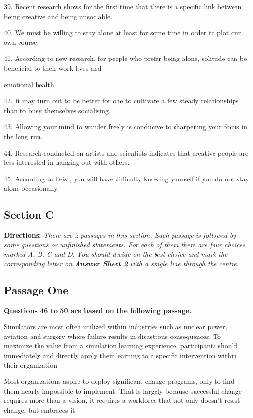 \documentclass[UTF8,11pt]{ctexart}
\begin{document}
39. Recent research shows for the first time that there is a specific link between being creative and being unsociable.


40. We must be willing to stay alone at least for some time in order to plot our own course.


41. According to new research, for people who prefer being alone, solitude can be beneficial to their work lives and


emotional health.


42. It may turn out to be better for one to cultivate a few steady relationships than to busy themselves socialising.


43. Allowing your mind to wander freely is conducive to sharpening your focus in the long run.


44. Research conducted on artists and scientists indicates that creative people are less interested in hanging out with others.


45. According to Feist, you will have difficulty knowing yourself if you do not stay alone occasionally.


\subsection*{\textbf{Section C}}


\textbf{Directions: }\textit{There are 2 passages in this section. Each passage is followed by some questions or unfinished} \textit{statements. For each of them there are four choices marked A, B, C and D. You should decide on the best choice and} \textit{mark the corresponding letter on }\textbf{\textit{Answer Sheet 2}}\textit{ with a single line through the centre.}


\subsection*{\textbf{Passage One}}


\textbf{Questions 46 to 50 are based on the following passage.}


Simulators are most often utilized within industries such as nuclear power, aviation and surgery where failure results in disastrous consequences. To maximize the value from a simulation learning experience, participants should immediately and directly apply their learning to a specific intervention within their organization.


Most organizations aspire to deploy significant change programs, only to find them nearly impossible to implement. That is largely because successful change requires more than a vision, it requires a workforce that not only doesn’t resist change, but embraces it.
\end{document}
